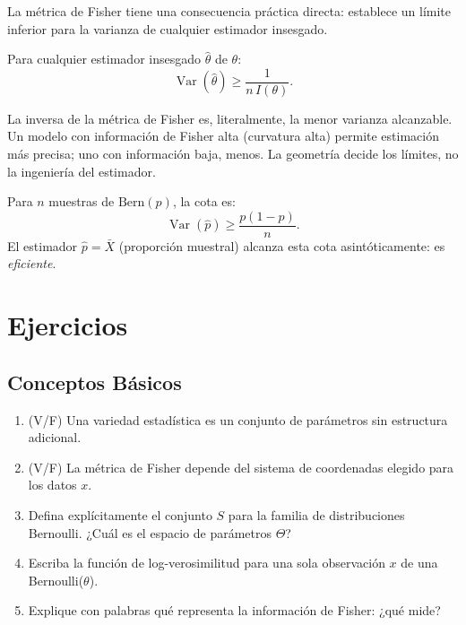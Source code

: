 La métrica de Fisher tiene una consecuencia práctica directa: establece un límite inferior para la varianza de cualquier estimador insesgado.

\begin{theorem}
	Para cualquier estimador insesgado $\hat\theta$ de $\theta$:
	\[
	\operatorname{Var}(\hat\theta) \ge \frac{1}{n \, I(\theta)}.
	\]
\end{theorem}

La inversa de la métrica de Fisher es, literalmente, la menor varianza alcanzable. Un modelo con información de Fisher alta (curvatura alta) permite estimación más precisa; uno con información baja, menos. La geometría decide los límites, no la ingeniería del estimador.

\begin{example}
	Para $n$ muestras de $\mathrm{Bern}(p)$, la cota es:
	\[
	\operatorname{Var}(\hat p) \ge \frac{p(1-p)}{n}.
	\]
	El estimador $\hat p = \bar X$ (proporción muestral) alcanza esta cota asintóticamente: es \emph{eficiente}.
\end{example}

\section{Ejercicios}

\subsection*{Conceptos Básicos}
\begin{enumerate}
	\item[$\star$] (V/F) Una variedad estadística es un conjunto de parámetros sin estructura adicional.
	\item[$\star$] (V/F) La métrica de Fisher depende del sistema de coordenadas elegido para los datos $x$.
	\item[$\star$] Defina explícitamente el conjunto $S$ para la familia de distribuciones Bernoulli. ¿Cuál es el espacio de parámetros $\Theta$?
	\item[$\star$] Escriba la función de log-verosimilitud para una sola observación $x$ de una Bernoulli($\theta$).
	\item[$\star$] Explique con palabras qué representa la información de Fisher: ¿qué mide?
\end{enumerate}


